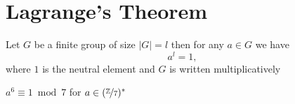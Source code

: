 \section{Lagrange's Theorem}

\begin{theorem}
Let $G$ be a finite group of size $|G| = l$ then for any $a \in G$ we have
\[
a^l = 1,
\]
where $1$ is the neutral element and $G$ is written multiplicatively
\end{theorem}

\begin{example}
$a^6 \equiv 1 \bmod 7$ for $a \in (\nicefrac{\mathbb{Z}}{7})^{\ast}$
\end{example}